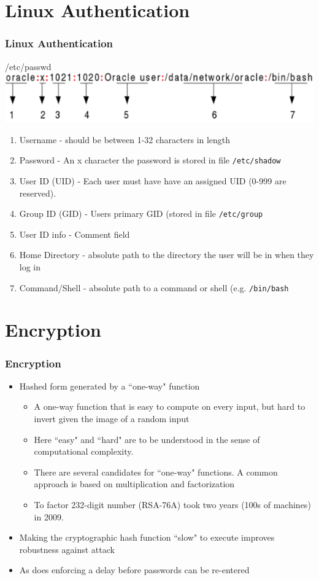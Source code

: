 \documentclass{beamer}
\begin{document}
\section{Linux Authentication}
\begin{frame}
\frametitle{Linux Authentication}
/etc/passwd\\
\includegraphics[scale=0.35]{pword.png}
\begin{enumerate}
\item Username - should be between 1-32 characters in length
\item Password - An x character the password is stored in file \texttt{/etc/shadow}
\item User ID (UID) - Each user must have have an assigned UID (0-999 are reserved).
\item Group ID (GID) - Users primary GID (stored in file \texttt{/etc/group}
\item User ID info - Comment field
\item Home Directory - absolute path to the directory the user will be in when they log in
\item Command/Shell - absolute path to a command or shell (e.g. \texttt{/bin/bash}
\end{enumerate}
\end{frame}
\section{Encryption}
\begin{frame}
\frametitle{Encryption}
\begin{itemize}
\item Hashed form generated by a ``one-way" function
\begin{itemize}
\item A one-way function that is easy to compute on every input, but hard to invert given the image of a random input
\item Here ``easy" and ``hard" are to be understood in the sense of computational complexity.
\item There are several candidates for ``one-way" functions. A common approach is based on multiplication and factorization
\item To factor 232-digit number (RSA-76A) took two years (100s of machines) in 2009.
\end{itemize}
\item Making the cryptographic hash function ``slow" to execute improves robustness against attack
\item As does enforcing a delay before passwords can be re-entered
\end{itemize}
\end{frame}
\end{document}

